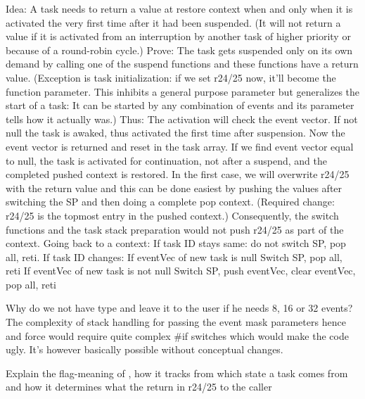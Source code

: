     Idea: A task needs to return a value at restore context when and only when it is
    activated the very first time after it had been suspended. (It will not return a value
    if it is activated from an interruption by another task of higher priority or because
    of a round-robin cycle.) Prove: The
    task gets suspended only on its own demand by calling one of the suspend functions
    and these functions have a return value. (Exception is task initialization: if we set
    r24/25 now, it'll become the function parameter. This inhibits a general purpose
    parameter but generalizes the start of a task: It can be started by any combination of
    events and its parameter tells how it actually was.)
      Thus: The activation will check the event vector. If not null the task is awaked,
    thus activated the first time after suspension. Now the event vector is returned and
    reset in the task array. If we find event vector equal to null, the task is activated
    for continuation, not after a suspend, and the completed pushed context is restored.
      In the first case, we will overwrite r24/25 with the return value and this can be
    done easiest by pushing the values after switching the SP and then doing a complete pop
    context. (Required change: r24/25 is the topmost entry in the pushed context.)
    Consequently, the switch functions and the task stack preparation would not push r24/25
    as part of the context.
      Going back to a context:
    If task ID stays same: do not switch SP, pop all, reti.
    If task ID changes:
        If eventVec of new task is null
            Switch SP, pop all, reti
        If eventVec of new task is not null
            Switch SP, push eventVec, clear eventVec, pop all, reti

Why do we not have type  and leave it to the user if he needs
8, 16 or 32 events? The complexity of stack handling for passing the event
mask parameters hence and force would require quite complex \#if switches
which would make the code ugly. It's however basically possible without
conceptual changes.

Explain the flag-meaning of , how it tracks from which
state a task comes from and how it determines what the return in r24/25 to
the caller

